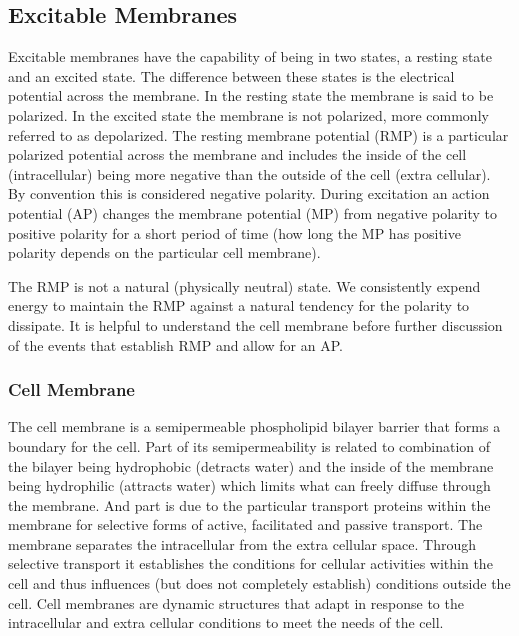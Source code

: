\subsection{Excitable Membranes}

Excitable membranes have the capability of being in two states, a resting state and an excited state. The difference between these states is the electrical potential across the membrane. In the resting state the membrane is said to be polarized. In the excited state the membrane is not polarized, more commonly referred to as depolarized. The resting membrane potential (RMP) is a particular polarized potential across the membrane and includes the inside of the cell (intracellular) being more negative than the outside of the cell (extra cellular). By convention this is considered negative polarity.\footnotemark{} During excitation an action potential (AP) changes the membrane potential (MP) from negative polarity to positive polarity for a short period of time (how long the MP has positive polarity depends on the particular cell membrane).

The RMP is not a natural (physically neutral) state. We consistently expend energy to maintain the RMP against a natural tendency for the polarity to dissipate. It is helpful to understand the cell membrane before further discussion of the events that establish RMP and allow for an AP.

\subsubsection{Cell Membrane}

The cell membrane is a semipermeable phospholipid bilayer barrier that forms a boundary for the cell. Part of its semipermeability is related to combination of the bilayer being hydrophobic (detracts water) and the inside of the membrane being hydrophilic (attracts water) which limits what can freely diffuse through the membrane. And part is due to the particular transport proteins within the membrane for selective forms of active, facilitated and passive transport. The membrane separates the intracellular from the extra cellular space. Through selective transport it establishes the conditions for cellular activities within the cell and thus influences (but does not completely establish) conditions outside the cell. Cell membranes are dynamic structures that adapt in response to the intracellular and extra cellular conditions to meet the needs of the cell.


